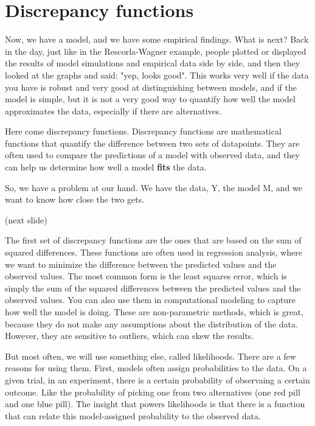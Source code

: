 \documentclass[12pt]{article}
\begin{document}
\section{Discrepancy functions}

Now, we have a model, and we have some empirical findings. What is next? Back in the day, just like in the Rescorla-Wagner example, people plotted or displayed the results of model simulations and empirical data side by side, and then they looked at the graphs and said: "yep, looks good". This works very well if the data you have is robust and very good at distinguishing between models, and if the model is simple, but it is not a very good way to quantify how well the model approximates the data, especially if there are alternatives.

Here come discrepancy functions. Discrepancy functions are mathematical functions that quantify the difference between two sets of datapoints. They are often used to compare the predictions of a model with observed data, and they can help us determine how well a model \textbf{fits} the data.

So, we have a problem at our hand. We have the data, Y, the model M, and we want to know how close the two gets.

(next slide)

The first set of discrepancy functions are the ones that are based on the sum of squared differences. These functions are often used in regression analysis, where we want to minimize the difference between the predicted values and the observed values. The most common form is the least squares error, which is simply the sum of the squared differences between the predicted values and the observed values. You can also use them in computational modeling to capture how well the model is doing. These are non-parametric methods, which is great, because they do not make any assumptions about the distribution of the data. However, they are sensitive to outliers, which can skew the results.

But most often, we will use something else, called likelihoods. There are a few reasons for using them. First, models often assign probabilities to the data. On a given trial, in an experiment, there is a certain probability of observaing a certain outcome. Like the probability of picking one from two alternatives (one red pill and one blue pill). The insight that powers likelihoods is that there is a function that can relate this model-assigned probability to the observed data.
\end{document}
